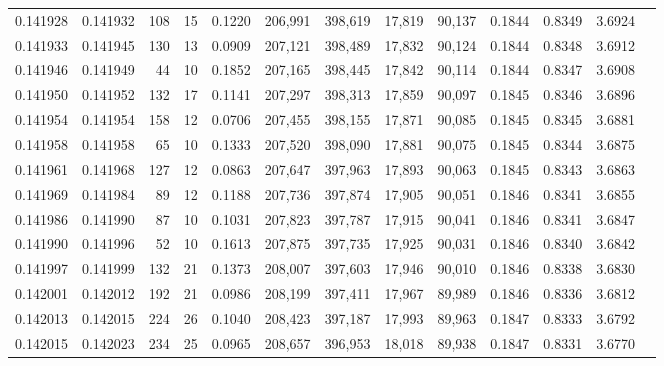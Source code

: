 \begin{tabular}{rrrrrrrrrrrrr}
0.141928 & 0.141932 &   108 &  15 &                                     0.1220 & 206,991 & 398,619 &  17,819 &  90,137 & 0.1844 & 0.8349 & 3.6924 \\
0.141933 & 0.141945 &   130 &  13 &                                     0.0909 & 207,121 & 398,489 &  17,832 &  90,124 & 0.1844 & 0.8348 & 3.6912 \\
0.141946 & 0.141949 &    44 &  10 &                                     0.1852 & 207,165 & 398,445 &  17,842 &  90,114 & 0.1844 & 0.8347 & 3.6908 \\
0.141950 & 0.141952 &   132 &  17 &                                     0.1141 & 207,297 & 398,313 &  17,859 &  90,097 & 0.1845 & 0.8346 & 3.6896 \\
0.141954 & 0.141954 &   158 &  12 &                                     0.0706 & 207,455 & 398,155 &  17,871 &  90,085 & 0.1845 & 0.8345 & 3.6881 \\
0.141958 & 0.141958 &    65 &  10 &                                     0.1333 & 207,520 & 398,090 &  17,881 &  90,075 & 0.1845 & 0.8344 & 3.6875 \\
0.141961 & 0.141968 &   127 &  12 &                                     0.0863 & 207,647 & 397,963 &  17,893 &  90,063 & 0.1845 & 0.8343 & 3.6863 \\
0.141969 & 0.141984 &    89 &  12 &                                     0.1188 & 207,736 & 397,874 &  17,905 &  90,051 & 0.1846 & 0.8341 & 3.6855 \\
0.141986 & 0.141990 &    87 &  10 &                                     0.1031 & 207,823 & 397,787 &  17,915 &  90,041 & 0.1846 & 0.8341 & 3.6847 \\
0.141990 & 0.141996 &    52 &  10 &                                     0.1613 & 207,875 & 397,735 &  17,925 &  90,031 & 0.1846 & 0.8340 & 3.6842 \\
0.141997 & 0.141999 &   132 &  21 &                                     0.1373 & 208,007 & 397,603 &  17,946 &  90,010 & 0.1846 & 0.8338 & 3.6830 \\
0.142001 & 0.142012 &   192 &  21 &                                     0.0986 & 208,199 & 397,411 &  17,967 &  89,989 & 0.1846 & 0.8336 & 3.6812 \\
0.142013 & 0.142015 &   224 &  26 &                                     0.1040 & 208,423 & 397,187 &  17,993 &  89,963 & 0.1847 & 0.8333 & 3.6792 \\
0.142015 & 0.142023 &   234 &  25 &                                     0.0965 & 208,657 & 396,953 &  18,018 &  89,938 & 0.1847 & 0.8331 & 3.6770 \\

\end{tabular}
